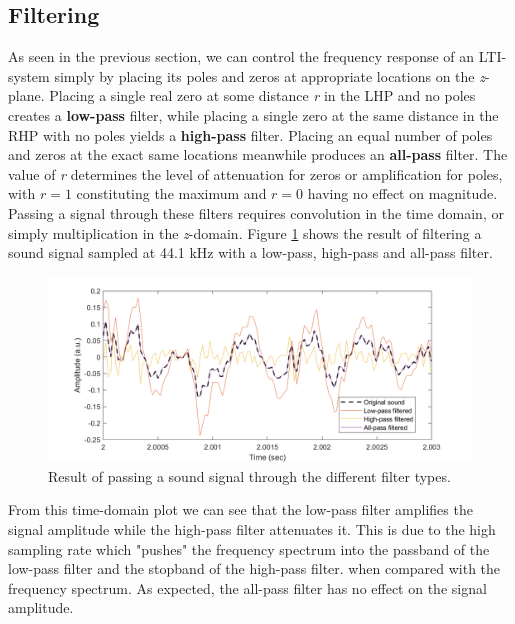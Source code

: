 \documentclass[journal]{IEEEtran}
\begin{document}
\subsection{Filtering} 
As seen in the previous section, we can control the frequency response of an LTI-system simply by placing its poles and zeros at appropriate locations on the \textit{z}-plane. Placing a single real zero at some distance \textit{r} in the LHP and no poles creates a \textbf{low-pass} filter, while placing a single zero at the same distance in the RHP with no poles yields a \textbf{high-pass} filter. Placing an equal number of poles and zeros at the exact same locations meanwhile produces an \textbf{all-pass} filter. The value of \textit{r} determines the level of attenuation for zeros or amplification for poles, with $r=1$ constituting the maximum and $r=0$ having no effect on magnitude.\\
Passing a signal through these filters requires convolution in the time domain, or simply multiplication in the \textit{z}-domain. Figure \ref{fig:filtered_sound} shows the result of filtering a sound signal sampled at 44.1 kHz with a low-pass, high-pass and all-pass filter. 
\begin{figure}[H]
    \centering
    \includegraphics[width=\columnwidth]{assignment_01/plots/filtered_sound.png}
    \caption{Result of passing a sound signal through the different filter types.}
    \label{fig:filtered_sound}
\end{figure}
From this time-domain plot we can see that the low-pass filter amplifies the signal amplitude while the high-pass filter attenuates it. This is due to the high sampling rate which "pushes" the frequency spectrum into the passband of the low-pass filter and the stopband of the high-pass filter. when compared with the frequency spectrum. As expected, the all-pass filter has no effect on the signal amplitude. 
\end{document}
